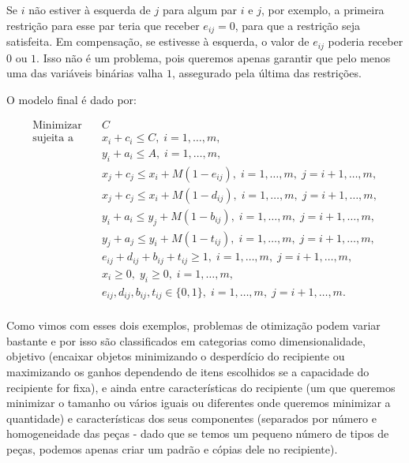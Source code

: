 \documentclass{article}
\begin{document}


Se $i$ não estiver à esquerda de $j$ para algum par $i$ e $j$, por exemplo, a primeira restrição para esse par teria que receber $e_{ij} = 0$, para que a restrição seja satisfeita. Em compensação, se estivesse à esquerda, o valor de $e_{ij}$ poderia receber $0$ ou $1$. Isso não é um problema, pois queremos apenas garantir que pelo menos uma das variáveis binárias valha $1$, assegurado pela última das restrições.

O modelo final é dado por:

\begin{equation*}
   \begin{aligned}
    \textrm{Minimizar} \quad & C\\
    \textrm{sujeita a} \quad & x_i + c_i \leq C, \; i = 1, \dots, m,\\
        & y_i + a_i \leq A, \; i = 1, \dots, m, \\
        & x_j + c_j \leq x_i + M(1-e_{ij}), \;i = 1, \dots, m, \;j = i+1, \dots, m,\\
        & x_j + c_j \leq x_i + M(1-d_{ij}), \;i = 1, \dots, m, \;j = i+1, \dots, m,\\
        & y_i + a_i \leq y_j + M(1-b_{ij}), \;i = 1, \dots, m, \;j = i+1, \dots, m,\\
        & y_j + a_j \leq y_i + M(1-t_{ij}), \;i = 1, \dots, m, \;j = i+1, \dots, m, \\
        & e_{ij} + d_{ij} + b_{ij} + t_{ij} \geq 1, \;i = 1, \dots, m, \;j = i+1, \dots, m, \\
        &x_i \geq 0, \; y_i \geq 0, \;i = 1, \dots, m,\\
        &e_{ij}, d_{ij}, b_{ij}, t_{ij} \in \{0,1\}, \;i = 1, \dots, m, \;j = i+1, \dots, m.\\
    \end{aligned}
\end{equation*}
\;

Como vimos com esses dois exemplos, problemas de otimização podem variar bastante e por isso são classificados em categorias como dimensionalidade, objetivo (encaixar objetos minimizando o desperdício do recipiente ou maximizando os ganhos dependendo de itens escolhidos se a capacidade do recipiente for fixa), e ainda entre características do recipiente (um que queremos minimizar o tamanho ou vários iguais ou diferentes onde queremos minimizar a quantidade) e características dos seus componentes (separados por número e homogeneidade das peças - dado que se temos um pequeno número de tipos de peças, podemos apenas criar um padrão e cópias dele no recipiente). 
\end{document}
